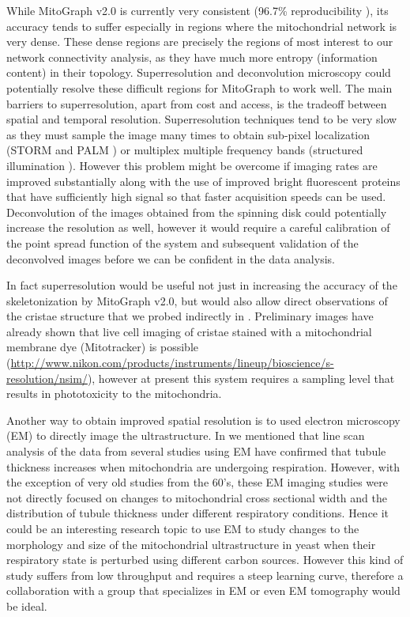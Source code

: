 While MitoGraph v2.0 is currently very consistent (96.7\% reproducibility \cite{viana_chapter_2015}), its accuracy tends to suffer especially in regions where the mitochondrial network is very dense. These dense regions are precisely the regions of most interest to our network connectivity analysis, as they have much more entropy (information content) in their topology. Superresolution and deconvolution microscopy could potentially resolve these difficult regions for MitoGraph to work well. The main barriers to superresolution, apart from cost and access, is the tradeoff between spatial and temporal resolution. Superresolution techniques tend to be very slow as they must sample the image many times to obtain sub-pixel localization (STORM \cite{rust_sub-diffraction-limit_2006} and PALM \cite{betzig_imaging_2006}) or multiplex multiple frequency bands (structured illumination \cite{kner_super-resolution_2009}). However this problem might be overcome if imaging rates are improved substantially \cite{abrahamsson_fast_2013,babcock_fast_2013} along with the use of improved bright fluorescent proteins that have sufficiently high signal so that faster acquisition speeds can be used. Deconvolution of the images obtained from the spinning disk could potentially increase the resolution as well, however it would require a careful calibration of the point spread function of the system and subsequent validation of the deconvolved images before we can be confident in the data analysis.

In fact superresolution would be useful not just in increasing the accuracy of the skeletonization by MitoGraph v2.0, but would also allow direct observations of the cristae structure that we probed indirectly in . Preliminary images have already shown that live cell imaging of cristae stained with a mitochondrial membrane dye (Mitotracker) is possible (\url{http://www.nikon.com/products/instruments/lineup/bioscience/s-resolution/nsim/}), however at present this system requires a sampling level that results in phototoxicity to the mitochondria.

Another way to obtain improved spatial resolution is to used electron microscopy (EM) to directly image the ultrastructure. In  we mentioned that line scan analysis of the data from several studies using EM have confirmed that tubule thickness increases when mitochondria are undergoing respiration. However, with the exception of very old studies from the 60's, these EM imaging studies were not directly focused on changes to mitochondrial cross sectional width and the distribution of tubule thickness under different respiratory conditions. Hence it could be an interesting research topic to use EM to study changes to the morphology and size of the mitochondrial ultrastructure in yeast when their respiratory state is perturbed using different carbon sources. However this kind of study suffers from low throughput and requires a steep learning curve, therefore a collaboration with a group that specializes in EM or even EM tomography would be ideal.
